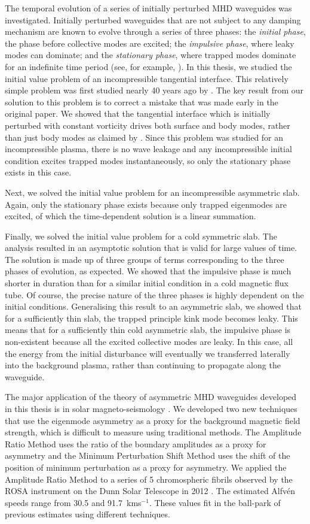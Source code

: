 The temporal evolution of a series of initially perturbed MHD waveguides was investigated. Initially perturbed waveguides that are not subject to any damping mechanism are known to evolve through a series of three phases: the \textit{initial phase}, the phase before collective modes are excited; the \textit{impulsive phase}, where leaky modes can dominate; and the \textit{stationary phase}, where trapped modes dominate for an indefinite time period (see, for example, \cite{rud_etal06b}). In this thesis, we studied the initial value problem of an incompressible tangential interface. This relatively simple problem was first studied nearly 40 years ago by \cite{rae_etal81}. The key result from our solution to this problem is to correct a mistake that was made early in the original paper. We showed that the tangential interface which is initially perturbed with constant vorticity drives both surface and body modes, rather than just body modes as claimed by \cite{rae_etal81}. Since this problem was studied for an incompressible plasma, there is no wave leakage and any incompressible initial condition excites trapped modes instantaneously, so only the stationary phase exists in this case.

Next, we solved the initial value problem for an incompressible asymmetric slab. Again, only the stationary phase exists because only trapped eigenmodes are excited, of which the time-dependent solution is a linear summation.

Finally, we solved the initial value problem for a cold symmetric slab. The analysis resulted in an asymptotic solution that is valid for large values of time. The solution is made up of three groups of terms corresponding to the three phases of evolution, as expected. We showed that the impulsive phase is much shorter in duration than for a similar initial condition in a cold magnetic flux tube. Of course, the precise nature of the three phases is highly dependent on the initial conditions. Generalising this result to an asymmetric slab, we showed that for a sufficiently thin slab, the trapped principle kink mode becomes leaky. This means that for a sufficiently thin cold asymmetric slab, the impulsive phase is non-existent because all the excited collective modes are leaky. In this case, all the energy from the initial disturbance will eventually we transferred laterally into the background plasma, rather than continuing to propagate along the waveguide.

The major application of the theory of asymmetric MHD waveguides developed in this thesis is in solar magneto-seismology \citep{all_etal18a}. We developed two new techniques that use the eigenmode asymmetry as a proxy for the background magnetic field strength, which is difficult to measure using traditional methods. The Amplitude Ratio Method uses the ratio of the boundary amplitudes as a proxy for asymmetry and the Minimum Perturbation Shift Method uses the shift of the position of minimum perturbation as a proxy for asymmetry. We applied the Amplitude Ratio Method to a series of 5 chromospheric fibrils observed by the ROSA instrument on the Dunn Solar Telescope in 2012 \citep{all_etal19}. The estimated Alfv\'{e}n speeds range from 30.5 and 91.7~kms$^{-1}$. These values fit in the ball-park of previous estimates using different techniques.